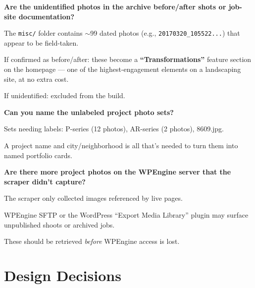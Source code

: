 \documentclass[11pt, letterpaper]{article}
\begin{document}
\begin{checklist}
  \item \textbf{Are the unidentified photos in the archive before/after shots or
        job-site documentation?}
    \begin{checklist}
      \item The \texttt{misc/} folder contains $\sim$99 dated photos (e.g.,
            \texttt{20170320\_105522...}) that appear to be field-taken.
      \item If confirmed as before/after: these become a
            \textbf{``Transformations''} feature section on the homepage ---
            one of the highest-engagement elements on a landscaping site,
            at no extra cost.
      \item If unidentified: excluded from the build.
    \end{checklist}

  \item \textbf{Can you name the unlabeled project photo sets?}
    \begin{checklist}
      \item Sets needing labels: P-series (12 photos), AR-series (2 photos), 8609.jpg.
      \item A project name and city/neighborhood is all that's needed to turn
            them into named portfolio cards.
    \end{checklist}

  \item \textbf{Are there more project photos on the WPEngine server that the
        scraper didn't capture?}
    \begin{checklist}
      \item The scraper only collected images referenced by live pages.
      \item WPEngine SFTP or the WordPress ``Export Media Library'' plugin may
            surface unpublished shoots or archived jobs.
      \item These should be retrieved \emph{before} WPEngine access is lost.
    \end{checklist}
\end{checklist}

\section{Design Decisions}
\end{document}
